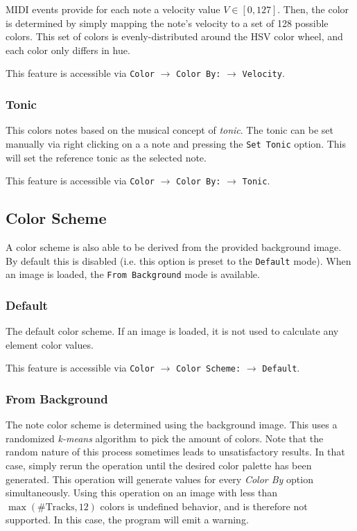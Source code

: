 \documentclass[english]{article}
\providecommand{\mi}[1]{\texttt{#1}}
\begin{document}
MIDI events provide for each note a velocity value $V \in [0, 127]$. Then, the color is determined by simply mapping 
the note's velocity to a set of 128 possible colors. This set of colors is evenly-distributed around
the HSV color wheel, and each color only differs in hue.

This feature is accessible via 
\mi{Color} $\rightarrow$ \mi{Color By:} $\rightarrow$ \mi{Velocity}.

\subsubsection{Tonic}

This colors notes based on the musical concept of \textit{tonic}. The tonic can be set manually via right clicking on a
a note and pressing the \mi{Set Tonic} option. This will set the reference tonic as the selected note.

This feature is accessible via 
\mi{Color} $\rightarrow$ \mi{Color By:} $\rightarrow$ \mi{Tonic}.

\subsection{Color Scheme}

A color scheme is also able to be derived from the provided background image. By default this is disabled (i.e.
this option is preset to the \mi{Default} mode). When an image is loaded, the \mi{From Background} mode is available.

\subsubsection{Default}

The default color scheme. If an image is loaded, it is not used to calculate any element color values.

This feature is accessible via 
\mi{Color} $\rightarrow$ \mi{Color Scheme:} $\rightarrow$ \mi{Default}.

\subsubsection{From Background}

The note color scheme is determined using the background image. This uses a randomized \textit{k-means} algorithm
to pick the amount of colors. Note that the random nature of this process sometimes leads to unsatisfactory results.
In that case, simply rerun the operation until the desired color palette has been generated. This operation will
generate values for every \textit{Color By} option simultaneously. Using this operation on an image with less
than $\max(\text{\# Tracks}, 12)$ colors is undefined behavior, and is therefore not supported. In this case,
the program will emit a warning.
\end{document}
